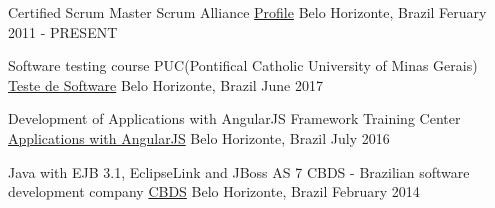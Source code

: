 

\begin{cventries}

  \cventry
    {Certified Scrum Master} %
    {Scrum Alliance} %
    {\href{https://www.scrumalliance.org/community/profile/agomes7}{Profile}}
    {Belo Horizonte, Brazil} %
    {Feruary 2011 - PRESENT} %

  \cventry 
    {Software testing course} %
    {PUC(Pontifical Catholic University of Minas Gerais)} %
    {\href{http://www.pucminas.br/Pos-Graduacao/IEC/Cursos/Paginas/Teste-de-Software.aspx}{Teste de Software}}
    {Belo Horizonte, Brazil} %
    {June 2017} %

  \cventry 
    {Development of Applications with AngularJS} %
    {Framework Training Center} %
    {\href{http://www.frameworksystem.com/courses/desenvolvimento-de-aplicacoes-com-angularjs}{Applications with AngularJS}}
    {Belo Horizonte, Brazil} %
    {July 2016} %
    
  \cventry 
    {Java with EJB 3.1, EclipseLink and JBoss AS 7} %
    {CBDS - Brazilian software development company} %
    {\href{http://www.cbds.com.br}{CBDS}}
    {Belo Horizonte, Brazil} %
    {February 2014} %

\end{cventries}
